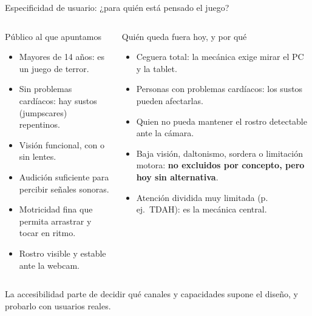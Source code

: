 \documentclass[aspectratio=169,11pt]{beamer}
\newcommand{\smallnote}[1]{{\color{Muted}\scriptsize #1}}
\newcommand{\strong}[1]{{\color{Navy}\bfseries #1}}
\begin{document}
\begin{frame}{Especificidad de usuario: ¿para quién está pensado el juego?}
  \footnotesize
  \begin{columns}[T,onlytextwidth]
      \begin{block}{Público al que apuntamos}
        \begin{itemize}
          \item Mayores de 14 años: es un juego de terror.
          \item Sin problemas cardíacos: hay sustos (jumpscares) repentinos.
          \item Visión funcional, con o sin lentes.
          \item Audición suficiente para percibir señales sonoras.
          \item Motricidad fina que permita arrastrar y tocar en ritmo.
          \item Rostro visible y estable ante la webcam.
        \end{itemize}
      \end{block}
      \begin{block}{Quién queda fuera hoy, y por qué}
        \begin{itemize}
          \item Ceguera total: la mecánica exige mirar el PC y la tablet.
          \item Personas con problemas cardíacos: los sustos pueden afectarlas.
          \item Quien no pueda mantener el rostro detectable ante la cámara.
          \item Baja visión, daltonismo, sordera o limitación motora: \strong{no excluidos por concepto, pero hoy sin alternativa}.
          \item Atención dividida muy limitada (p.\,ej.\ TDAH): es la mecánica central.
        \end{itemize}
      \end{block}
  \end{columns}
  \smallnote{La accesibilidad parte de decidir qué canales y capacidades supone el diseño, y probarlo con usuarios reales.}
\end{frame}
\end{document}
